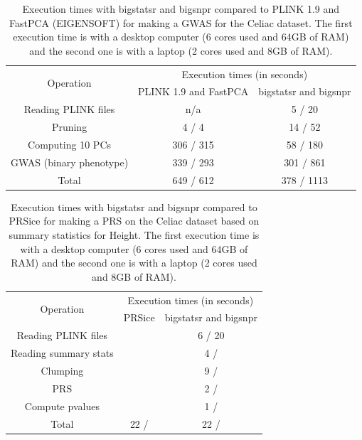 \documentclass{bioinfo}
\begin{document}
\begin{table}[!tpb]
\begin{center}
\begin{adjustbox}{max width=235pt}
\begin{tabular}{|c|c|c|}
\hline
\multirow{2}{*}{Operation} &   \multicolumn{2}{c|}{Execution times (in seconds)} \\
 \cline{2-3}
 & PLINK 1.9 and FastPCA & bigstatsr and bigsnpr \\
\hline
Reading PLINK files & n/a & 5 / 20 \\
Pruning & 4 / 4 & 14 / 52 \\
Computing 10 PCs & 306 / 315 & 58 / 180 \\
GWAS (binary phenotype) & 339 / 293 & 301 / 861 \\
\hline
Total & 649 / 612 & 378 / 1113 \\
\hline
\end{tabular} 
\end{adjustbox}
\end{center}
\caption{Execution times with bigstatsr and bigsnpr compared to PLINK 1.9 and FastPCA (EIGENSOFT) for making a GWAS for the Celiac dataset. The first execution time is with a desktop computer (6 cores used and 64GB of RAM) and the second one is with a laptop (2 cores used and 8GB of RAM).} 
\label{tab:bench-gwas}
\end{table}

\begin{table}[!tpb]
\begin{center}
\begin{adjustbox}{max width=235pt}
\begin{tabular}{|c|c|c|}
\hline
\multirow{2}{*}{Operation} &   \multicolumn{2}{c|}{Execution times (in seconds)} \\
 \cline{2-3}
 & PRSice & bigstatsr and bigsnpr \\
\hline
Reading PLINK files &  & 6 / 20 \\
Reading summary stats &  & 4 /   \\
Clumping &  & 9 /  \\
PRS &  & 2 /  \\
Compute pvalues &  & 1 /  \\
\hline
Total & 22 /  & 22 /  \\
\hline
\end{tabular} 
\end{adjustbox}
\end{center}
\caption{Execution times with bigstatsr and bigsnpr compared to PRSice for making a PRS on the Celiac dataset based on summary statistics for Height. The first execution time is with a desktop computer (6 cores used and 64GB of RAM) and the second one is with a laptop (2 cores used and 8GB of RAM).}
\label{tab:bench-prs}
\end{table}
\end{document}
